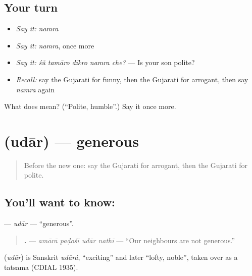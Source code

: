 \subsection*{Your turn}
\begin{itemize}
\raggedright
  \item \emph{Say it:} \emph{namra}
  \item \emph{Say it:} \emph{namra}, once more
  \item \emph{Say it:} \emph{śũ tamāro dīkro namra che?} — Is your son polite?
  \item \emph{Recall:} say the Gujarati for funny, then the Gujarati for arrogant, then say \emph{namra} again
\end{itemize}

\begin{tcolorbox}[breakable,colback=teal!4,colframe=teal!35!black,title={Before you move on}]
What does  mean? (\textquotedblleft{}Polite, humble\textquotedblright{}.) Say it once more.
\end{tcolorbox}
\section[\texorpdfstring{\gu{ઉદાર} (udār)}{ઉદાર (udār)}]{ (udār) — generous}

\label{lesson:GU-C271-udar}



\begin{quote}
Before the new one: say the Gujarati for arrogant, then the Gujarati for polite.
\end{quote}

\subsection*{You'll want to know: }
\textbf{} — \emph{udār} — \textquotedblleft{}generous\textquotedblright{}.

\begin{quote}
\textbf{   .} — \emph{amārā paḍośī udār nathī} — \textquotedblleft{}Our neighbours are not generous.\textquotedblright{}
\end{quote}

\begin{cousinweb}
\textbf{} (\emph{udār}) is Sanskrit \emph{udārá}, \textquotedblleft{}exciting\textquotedblright{} and later \textquotedblleft{}lofty, noble\textquotedblright{}, taken over as a tatsama (CDIAL 1935).
\end{cousinweb}

